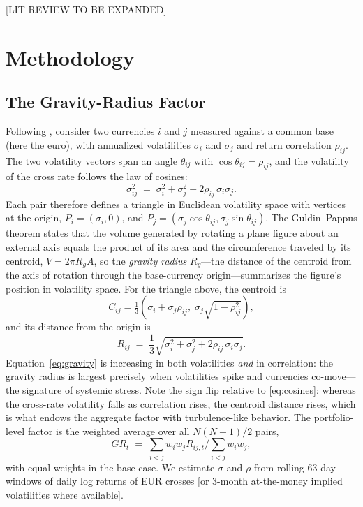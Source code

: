 \documentclass[12pt]{article}
\begin{document}
[LIT REVIEW TO BE EXPANDED]

\section{Methodology}\label{sec:method}

\subsection{The Gravity-Radius Factor}\label{sec:gravity}

Following \citet{konstantinov2022geometry}, consider two currencies $i$ and $j$ measured against a common base (here the euro), with annualized volatilities $\sigma_i$ and $\sigma_j$ and return correlation $\rho_{ij}$. The two volatility vectors span an angle $\theta_{ij}$ with $\cos\theta_{ij}=\rho_{ij}$, and the volatility of the cross rate follows the law of cosines:
\begin{equation}
\sigma_{ij}^2 \;=\; \sigma_i^2 + \sigma_j^2 - 2\rho_{ij}\,\sigma_i\sigma_j .
\label{eq:cosines}
\end{equation}
Each pair therefore defines a triangle in Euclidean volatility space with vertices at the origin, $P_i=(\sigma_i,0)$, and $P_j=(\sigma_j\cos\theta_{ij}, \sigma_j\sin\theta_{ij})$. The Guldin--Pappus theorem states that the volume generated by rotating a plane figure about an external axis equals the product of its area and the circumference traveled by its centroid, $V = 2\pi R_g A$, so the \emph{gravity radius} $R_g$---the distance of the centroid from the axis of rotation through the base-currency origin---summarizes the figure's position in volatility space. For the triangle above, the centroid is
\begin{equation}
C_{ij} = \tfrac{1}{3}\left(\sigma_i + \sigma_j\rho_{ij},\; \sigma_j\sqrt{1-\rho_{ij}^2}\right),
\end{equation}
and its distance from the origin is
\begin{equation}
R_{ij} \;=\; \frac{1}{3}\sqrt{\sigma_i^2 + \sigma_j^2 + 2\rho_{ij}\,\sigma_i\sigma_j}.
\label{eq:gravity}
\end{equation}
Equation~\eqref{eq:gravity} is increasing in both volatilities \emph{and} in correlation: the gravity radius is largest precisely when volatilities spike and currencies co-move---the signature of systemic stress. Note the sign flip relative to \eqref{eq:cosines}: whereas the cross-rate volatility falls as correlation rises, the centroid distance rises, which is what endows the aggregate factor with turbulence-like behavior. The portfolio-level factor is the weighted average over all $N(N-1)/2$ pairs,
\begin{equation}
GR_t \;=\; \sum_{i<j} w_i w_j R_{ij,t} \Big/ \sum_{i<j} w_i w_j ,
\label{eq:grindex}
\end{equation}
with equal weights in the base case. We estimate $\sigma$ and $\rho$ from rolling 63-day windows of daily log returns of EUR crosses [or 3-month at-the-money implied volatilities where available].
\end{document}
